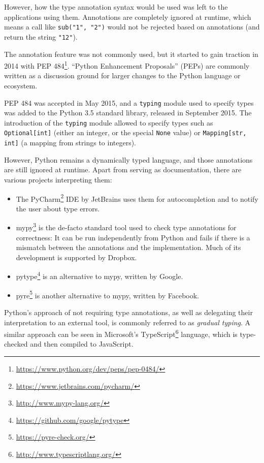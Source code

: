 \documentclass[a4paper,parskip=full]{scrreprt}
\newcommand{\py}[1]{\texttt{#1}}
\begin{document}
However, how the type annotation syntax would be used was left to the
applications using them. Annotations are completely ignored at runtime, which
means a call like \py{sub("1", "2")} would not be rejected based on annotations
(and return the string \py{"12"}).

The annotation feature was not commonly used, but it started to gain traction
in 2014 with PEP 484\footnote{\url{https://www.python.org/dev/peps/pep-0484/}}.
``Python Enhancement Proposals'' (PEPs) are commonly written as a discussion
ground for larger changes to the Python language or ecosystem.

PEP 484 was accepted in May 2015, and a \verb|typing| module used to specify types
was added to the Python 3.5 standard library, released in September 2015. The
introduction of the \verb|typing| module allowed to specify types such as
\py{Optional[int]} (either an integer, or the special \py{None} value) or
\py{Mapping[str, int]} (a mapping from strings to integers).

However, Python remains a dynamically typed language, and those annotations are
still ignored at runtime. Apart from serving as documentation, there are various
projects interpreting them:

\label{typecheck-tools}
\begin{itemize}
  \item The PyCharm\footnote{\url{https://www.jetbrains.com/pycharm/}} IDE by
    JetBrains uses them for autocompletion and to notify the user about type
    errors.
  \item mypy\footnote{\url{http://www.mypy-lang.org/}} is the de-facto standard
    tool used to check type annotations for correctness: It can be run
    independently from Python and fails if there is a mismatch between the
    annotations and the implementation. Much of its development is supported by
    Dropbox.
  \item pytype\footnote{\url{https://github.com/google/pytype}} is an
    alternative to mypy, written by Google.
  \item pyre\footnote{\url{https://pyre-check.org/}} is another alternative
    to mypy, written by Facebook.
\end{itemize}

Python's approach of not requiring type annotations, as well as delegating their
interpretation to an external tool, is commonly referred to as
\emph{gradual typing}. A similar approach can be seen in Microsoft's
TypeScript\footnote{\url{http://www.typescriptlang.org/}} language, which is
type-checked and then compiled to JavaScript.
\end{document}
